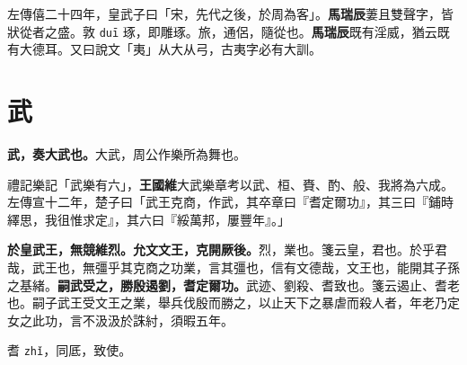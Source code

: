 \begin{quoting}左傳僖二十四年，皇武子曰「宋，先代之後，於周為客」。\textbf{馬瑞辰}萋且雙聲字，皆狀從者之盛。敦 \texttt{duī} 琢，即雕琢。旅，通侶，隨從也。\textbf{馬瑞辰}既有淫威，猶云既有大德耳。又曰說文「夷」从大从弓，古夷字必有大訓。\end{quoting}

\section{武}


\textbf{武，奏大武也。}{\footnotesize 大武，周公作樂所為舞也。}

\begin{quoting}禮記樂記「武樂有六」，\textbf{王國維}大武樂章考以武、桓、賚、酌、般、我將為六成。左傳宣十二年，楚子曰「武王克商，作武，其卒章曰『耆定爾功』，其三曰『鋪時繹思，我徂惟求定』，其六曰『綏萬邦，屢豐年』。」\end{quoting}

\textbf{於皇武王，無競維烈。允文文王，克開厥後。}{\footnotesize 烈，業也。箋云皇，君也。於乎君哉，武王也，無彊乎其克商之功業，言其彊也，信有文德哉，文王也，能開其子孫之基緒。}\textbf{嗣武受之，勝殷遏劉，耆定爾功。}{\footnotesize 武迹、劉殺、耆致也。箋云遏止、耆老也。嗣子武王受文王之業，舉兵伐殷而勝之，以止天下之暴虐而殺人者，年老乃定女之此功，言不汲汲於誅紂，須暇五年。}

\begin{quoting}耆 \texttt{zhǐ}，同厎，致使。\end{quoting}

